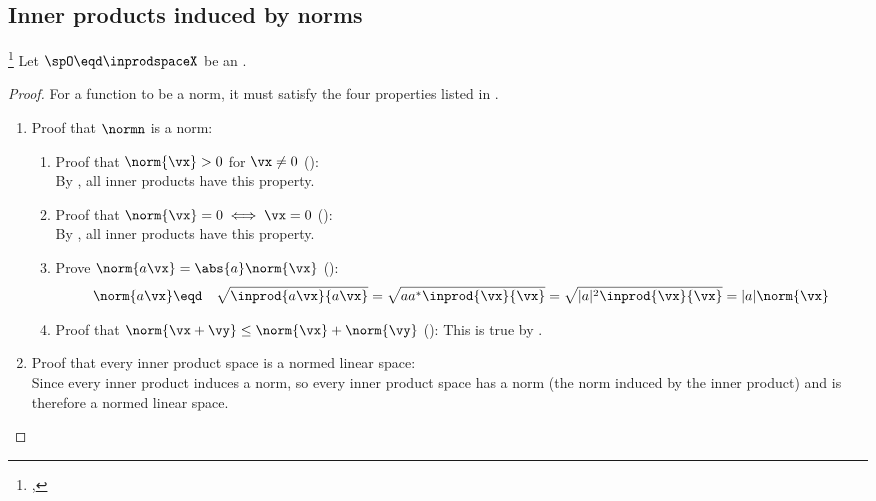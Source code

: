 \subsection{Inner products induced by norms}
\begin{theorem}
\footnote{
  ,
  }
\label{thm:norm=inprod}
\label{thm:inducednorm}
Let $\spO\eqd\inprodspaceX$ be an  .
\end{theorem}
\begin{proof}
For a function to be a norm, it must satisfy the four properties listed in
.
\begin{enumerate}
  \item Proof that $\normn$ is a norm:
\begin{enumerate}
  \item Proof that $\norm{\vx}>0$ for $\vx\ne 0$ (): \\
    By , all inner products have this property.

  \item Proof that $\norm{\vx}=0 \iff \vx=0$ (): \\
    By , all inner products have this property.

  \item Prove $\norm{a\vx}=\abs{a}\norm{\vx}$ ():
  \begin{eqnarray*}
    \norm{a\vx}
      &\eqd& \sqrt{\inprod{a\vx}{a\vx}}
      = \sqrt{a a^\ast \inprod{\vx}{\vx}}
      = \sqrt{|a|^2 \inprod{\vx}{\vx}}
      = |a| \norm{\vx}
  \end{eqnarray*}

  \item Proof that $\norm{\vx+\vy}\le\norm{\vx}+\norm{\vy}$ (): 
        This is true by .
\end{enumerate}

  \item Proof that every inner product space is a normed linear space:\\
    Since every inner product induces a norm, so every inner product space
    has a norm (the norm induced by the inner product)
    and is therefore a normed linear space.
\end{enumerate}
\end{proof}

